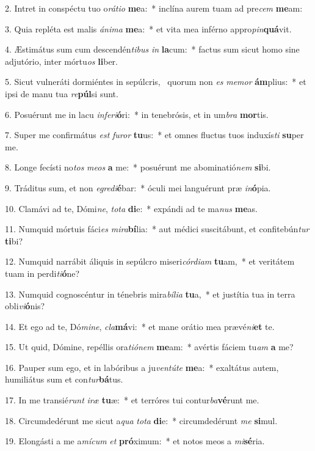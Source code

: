 2. Intret in conspéctu tuo o\textit{rá}\textit{ti}\textit{o} \textbf{me}a:~*  inclína aurem tuam ad pre\textit{cem} \textbf{me}am:\

3. Quia repléta est malis \textit{á}\textit{ni}\textit{ma} \textbf{me}a:~*  et vita mea inférno appro\textit{pin}\textbf{quá}vit.\

4. Æstimátus sum cum descendén\textit{ti}\textit{bus} \textit{in} \textbf{la}cum:~*  factus sum sicut homo sine adjutório, inter mórtu\textit{os} \textbf{li}ber.\

5. Sicut vulneráti dormiéntes in sepúlcris, \dag\  quorum non \textit{es} \textit{me}\textit{mor} \textbf{ám}plius:~*  et ipsi de manu tua \textit{re}\textbf{púl}si sunt.\

6. Posuérunt me in lacu \textit{in}\textit{fe}\textit{ri}\textbf{ó}ri:~*  in tenebrósis, et in um\textit{bra} \textbf{mor}tis.\

7. Super me confirmátus \textit{est} \textit{fu}\textit{ror} \textbf{tu}us:~*  et omnes fluctus tuos induxís\textit{ti} \textbf{su}per me.\

8. Longe fecísti no\textit{tos} \textit{me}\textit{os} \textbf{a} me:~*  posuérunt me abominatió\textit{nem} \textbf{si}bi.\

9. Tráditus sum, et non \textit{e}\textit{gre}\textit{di}\textbf{é}bar:~*  óculi mei languérunt præ \textit{in}\textbf{ó}pia.\

10. Clamávi ad te, Dómi\textit{ne}, \textit{to}\textit{ta} \textbf{di}e:~*  expándi ad te ma\textit{nus} \textbf{me}as.\

11. Numquid mórtuis fáci\textit{es} \textit{mi}\textit{ra}\textbf{bí}lia:~*  aut médici suscitábunt, et confitebún\textit{tur} \textbf{ti}bi?\

12. Numquid narrábit áliquis in sepúlcro miseri\textit{cór}\textit{di}\textit{am} \textbf{tu}am,~*  et veritátem tuam in perdi\textit{ti}\textbf{ó}ne?\

13. Numquid cognoscéntur in ténebris mira\textit{bí}\textit{li}\textit{a} \textbf{tu}a,~*  et justítia tua in terra obli\textit{vi}\textbf{ó}nis?\

14. Et ego ad te, Dó\textit{mi}\textit{ne}, \textit{cla}\textbf{má}vi:~*  et mane orátio mea prævé\textit{ni}\textbf{et} te.\

15. Ut quid, Dómine, repéllis ora\textit{ti}\textit{ó}\textit{nem} \textbf{me}am:~*  avértis fáciem tu\textit{am} \textbf{a} me?\

16. Pauper sum ego, et in labóribus a ju\textit{ven}\textit{tú}\textit{te} \textbf{me}a:~*  exaltátus autem, humiliátus sum et con\textit{tur}\textbf{bá}tus.\

17. In me transié\textit{runt} \textit{i}\textit{ræ} \textbf{tu}æ:~*  et terróres tui contur\textit{ba}\textbf{vé}runt me.\

18. Circumdedérunt me sicut a\textit{qua} \textit{to}\textit{ta} \textbf{di}e:~*  circumdedérunt \textit{me} \textbf{si}mul.\

19. Elongásti a me a\textit{mí}\textit{cum} \textit{et} \textbf{pró}ximum:~*  et notos meos a \textit{mi}\textbf{sé}ria.\

